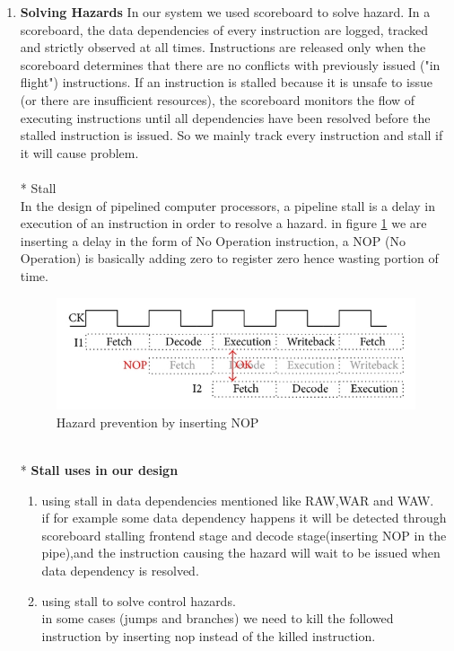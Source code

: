 \documentclass[../main.tex]{subfiles}
\begin{document}
\begin{enumerate}
\item \textbf{Solving Hazards}
In our system we used scoreboard to solve hazard.
In a scoreboard, the data dependencies of every instruction are logged, tracked and strictly observed at all times. Instructions are released only when the scoreboard determines that there are no conflicts with previously issued ("in flight") instructions. If an instruction is stalled because it is unsafe to issue (or there are insufficient resources), the scoreboard monitors the flow of executing instructions until all dependencies have been resolved before the stalled instruction is issued.
So we mainly track every instruction and stall if it will cause  problem.\\
\\* Stall\\
In the design of pipelined computer processors, a pipeline stall is a delay in execution of an instruction in order to resolve a hazard.
in figure \ref{fig:img2} we are inserting a delay in the form of No Operation instruction, a NOP (No Operation) is basically adding zero to register zero hence wasting portion of time.
   \begin{figure}[bh]
\centering
\includegraphics[scale=2]{diagrams/insertingnop.jpg}

\caption{Hazard prevention by inserting NOP}
\label{fig:img2}
\end{figure}
\\* \textbf {Stall uses in our design}
\begin{enumerate}
    \item using stall in data dependencies mentioned like RAW,WAR and WAW.\\
    if for example some data dependency happens it will be detected through scoreboard stalling frontend stage and decode stage(inserting NOP in the pipe),and the instruction causing the hazard will wait to be issued when data dependency is resolved.
    \item using stall to solve control hazards.\\
       in some cases (jumps and branches) we need to kill the followed instruction by inserting nop instead of the killed instruction.


\end{enumerate}
\end{enumerate}
\end{document}
